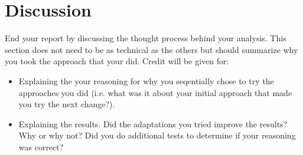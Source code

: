 \documentclass[11pt]{article}
\begin{document}
\section{Discussion} 


End your report by discussing the thought process behind your
analysis. This section does not need to be as technical as the others 
but should summarize why you took the approach that your did. Credit will be given for:

  \begin{itemize}
  \item Explaining the your reasoning for why you seqentially chose to
    try the approaches you did (i.e. what was it about your initial
    approach that made you try the next change?).  
  \item Explaining the results.  Did the adaptations you tried improve
    the results?  Why or why not?  Did you do additional tests to
    determine if your reasoning was correct?  
  \end{itemize}
 
\end{document}
